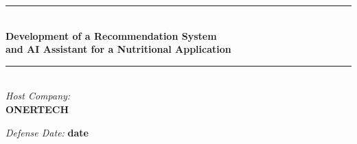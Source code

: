 \begin{titlepage}
\begin{center}
\rule{\linewidth}{0.5mm} \\[0.1cm]
{\large \bfseries Development of a Recommendation System \\and AI Assistant for a Nutritional Application
 \\[0.1cm] }
\rule{\linewidth}{0.5mm} \\[0.5cm]

{\emph{Host Company:}}\\
{\textbf{ONERTECH}}\\
\end{center}
 
\noindent
{\emph{Defense Date:}} {\textbf{date}}\\

\vspace{0.4cm}

\end{titlepage}

